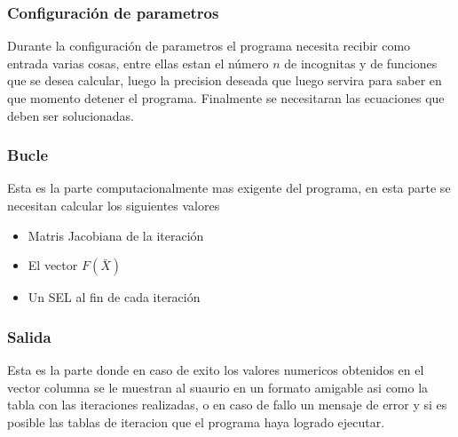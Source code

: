 \documentclass[11pt]{article}
\begin{document}
\subsubsection{Configuración de parametros}
Durante la configuración de parametros el programa necesita recibir como entrada varias cosas, entre ellas estan el número  $n$ de incognitas y de funciones que se desea calcular, luego la precision deseada que luego servira para saber en que momento detener el programa. Finalmente se necesitaran las ecuaciones que deben ser solucionadas.

\subsubsection{Bucle}
Esta es la parte computacionalmente mas exigente del programa, en esta parte se necesitan calcular los siguientes valores
\begin{itemize}
  \item Matris Jacobiana de la iteración
  \item El vector $F(\bar{X})$
  \item Un SEL al fin de cada iteración
\end{itemize}
\subsubsection{Salida}
Esta es la parte donde en caso de exito los valores numericos obtenidos en el vector columna se le muestran al suaurio en un formato amigable asi como la tabla con las iteraciones realizadas, o en caso de fallo un mensaje de error y si es posible las tablas de iteracion que el programa haya logrado ejecutar.  
\clearpage

\nocite{*}

\end{document}
